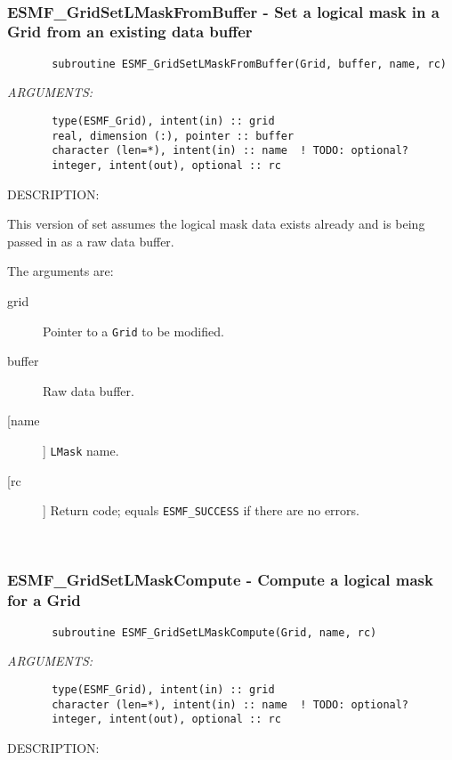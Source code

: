 {%
 
\mbox{}\hrulefill\ 
 
\subsubsection{ESMF\_GridSetLMaskFromBuffer - Set a logical mask in a Grid from an existing data buffer}


 
\begin{verbatim}       subroutine ESMF_GridSetLMaskFromBuffer(Grid, buffer, name, rc)\end{verbatim}{\em ARGUMENTS:}
\begin{verbatim}       type(ESMF_Grid), intent(in) :: grid
       real, dimension (:), pointer :: buffer
       character (len=*), intent(in) :: name  ! TODO: optional?
       integer, intent(out), optional :: rc            \end{verbatim}
{\sf DESCRIPTION:\\ }


       This version of set assumes the logical mask data exists already and is
       being passed in as a raw data buffer.
  
       The arguments are:
       \begin{description}
       \item[grid] 
            Pointer to a {\tt Grid} to be modified.
       \item[buffer]
            Raw data buffer.         
       \item [[name]]
             {\tt LMask} name.
       \item[[rc]] 
            Return code; equals {\tt ESMF\_SUCCESS} if there are no errors.
       \end{description}
   
 
\mbox{}\hrulefill\ 
 
\subsubsection{ESMF\_GridSetLMaskCompute - Compute a logical mask for a Grid}


 
\begin{verbatim}       subroutine ESMF_GridSetLMaskCompute(Grid, name, rc)\end{verbatim}{\em ARGUMENTS:}
\begin{verbatim}       type(ESMF_Grid), intent(in) :: grid
       character (len=*), intent(in) :: name  ! TODO: optional?
       integer, intent(out), optional :: rc            \end{verbatim}
{\sf DESCRIPTION:\\ }


}
